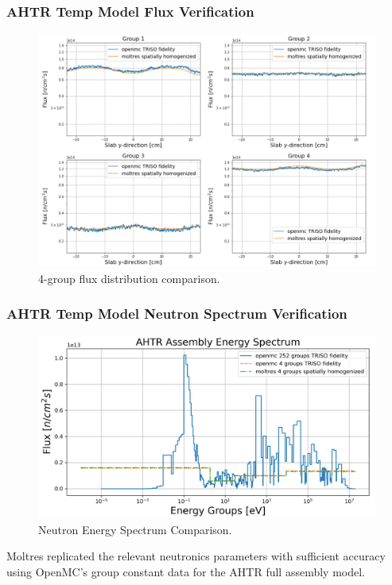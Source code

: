 \begin{frame}
    \frametitle{AHTR Temp Model Flux Verification}
    \begin{figure}[]
        \centering
        \includegraphics[width=0.8\linewidth]{figures/benchmark-flux.png} 
        \caption{4-group flux distribution comparison.}
    \end{figure}
\end{frame}

\begin{frame}
    \frametitle{AHTR Temp Model Neutron Spectrum Verification}
            \begin{figure}[]
                \centering
                \includegraphics[width=0.75\linewidth]{figures/benchmark-spectrum.png} 
                \caption{Neutron Energy Spectrum Comparison.}
            \end{figure}
        Moltres replicated the relevant neutronics parameters with sufficient accuracy
        using OpenMC's group constant data for the AHTR full assembly model.
\end{frame}
